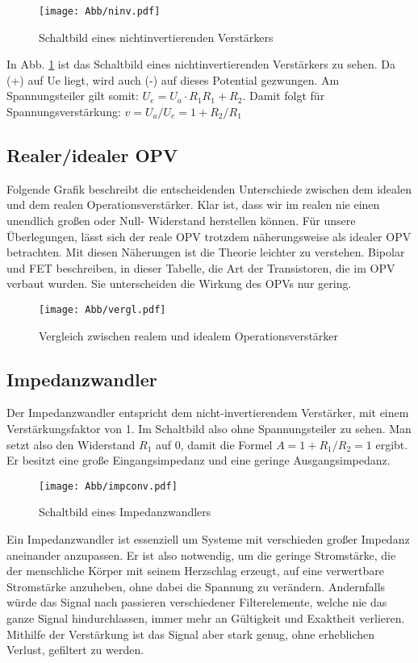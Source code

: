 \begin{figure}[H]
    \centering
    \texttt{[image: Abb/ninv.pdf]} 
    \caption{Schaltbild eines nichtinvertierenden Verstärkers}
    \label{ninv}
\end{figure}
In Abb. \ref{ninv} ist das Schaltbild eines nichtinvertierenden Verstärkers zu sehen. Da (+) auf Ue liegt, wird auch (-) auf dieses Potential gezwungen. Am Spannungsteiler gilt somit:
$U_e=U_a·R_1R_1+R_2$. 
Damit folgt für Spannungsverstärkung:
$v=U_a/U_e=1+R_2/R_1$

\subsection{Realer/idealer OPV}

Folgende Grafik beschreibt die entscheidenden Unterschiede zwischen dem idealen und dem realen Operationsverstärker.
Klar ist, dass wir im realen nie einen unendlich großen oder Null- Widerstand herstellen können. Für unsere Überlegungen, lässt sich der reale OPV trotzdem näherungsweise als idealer OPV betrachten. Mit diesen Näherungen ist die Theorie leichter zu verstehen. Bipolar und FET beschreiben, in dieser Tabelle, die Art der Transistoren, die im OPV verbaut wurden. Sie unterscheiden die Wirkung des OPVs nur gering.

\begin{figure}[H]
     \centering
     \texttt{[image: Abb/vergl.pdf]}
     \caption{Vergleich zwischen realem und idealem Operationsverstärker}
\end{figure}

\subsection{Impedanzwandler}

Der Impedanzwandler entspricht dem nicht-invertierendem Verstärker, mit einem Verstärkungsfaktor von 1. Im Schaltbild also ohne Spannungsteiler zu sehen. Man setzt also den Widerstand $R_1$ auf 0, damit die Formel $A= 1+ R_1/R_2 = 1$ ergibt. Er besitzt eine große Eingangsimpedanz und eine geringe Ausgangsimpedanz.
\begin{figure}[H]
     \centering
     \texttt{[image: Abb/impconv.pdf]}
     \caption{Schaltbild eines Impedanzwandlers}
\end{figure}
Ein Impedanzwandler ist essenziell um Systeme mit verschieden großer Impedanz aneinander anzupassen. Er ist also notwendig, um die geringe Stromstärke, die der menschliche Körper mit seinem Herzschlag erzeugt, auf eine verwertbare Stromstärke anzuheben, ohne dabei die Spannung zu verändern. Andernfalls würde das Signal nach passieren verschiedener Filterelemente, welche nie das ganze Signal hindurchlassen, immer mehr an Gültigkeit und Exaktheit verlieren. Mithilfe der Verstärkung ist das Signal aber stark genug, ohne erheblichen Verlust, gefiltert zu werden.

